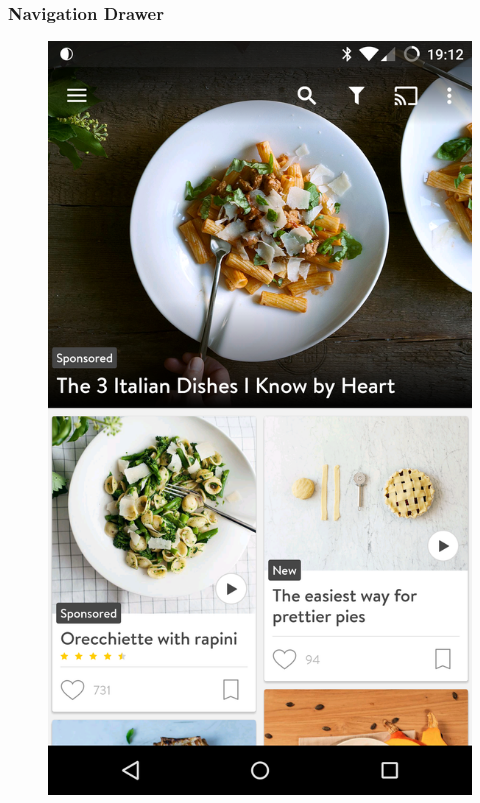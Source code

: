 \subsubsection{Navigation Drawer}
\begin{figure}[H]
	\centering
	{{\includegraphics[scale=0.1]{figures/findings/closed-nav-drawer-kitchenstories.png} }}%
	\qquad

\end{figure}
